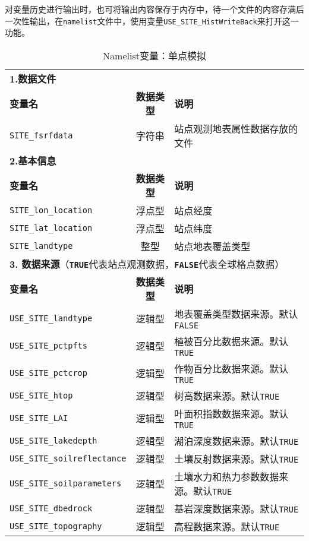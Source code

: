 对变量历史进行输出时，也可将输出内容保存于内存中，待一个文件的内容存满后一次性输出，在\texttt{namelist}文件中，使用变量\texttt{USE\_SITE\_HistWriteBack}来打开这一功能。

\begin{table}[!htbp] \small
\caption{Namelist变量：单点模拟}
\label{table_nl_singlepoint}
\centering \renewcommand{\arraystretch}{1.5}
\begin{tabular}{lcp{}}
\toprule
\textbf{1.数据文件} & & \\
\textbf{变量名} & \textbf{数据类型} & \textbf{说明} \\
\texttt{SITE\_fsrfdata} & 字符串 & 站点观测地表属性数据存放的文件 \\\midrule
\textbf{2.基本信息} & & \\
\textbf{变量名} & \textbf{数据类型} & \textbf{说明} \\
\texttt{SITE\_lon\_location} & 浮点型 & 站点经度 \\
\texttt{SITE\_lat\_location} & 浮点型 & 站点纬度 \\
\texttt{SITE\_landtype} & 整型 & 站点地表覆盖类型 \\
\midrule
\multicolumn{3}{l}{\textbf{3. 数据来源}（\textbf{\texttt{TRUE}}代表站点观测数据，\textbf{\texttt{FALSE}}代表全球格点数据）} \\
\textbf{变量名} & \textbf{数据类型} & \textbf{说明} \\
\texttt{USE\_SITE\_landtype} & 逻辑型 & 地表覆盖类型数据来源。默认\texttt{FALSE} \\
\texttt{USE\_SITE\_pctpfts} & 逻辑型 & 植被百分比数据来源。默认\texttt{TRUE} \\
\texttt{USE\_SITE\_pctcrop} & 逻辑型 & 作物百分比数据来源。默认\texttt{TRUE} \\
\texttt{USE\_SITE\_htop} & 逻辑型 & 树高数据来源。默认\texttt{TRUE} \\
\texttt{USE\_SITE\_LAI} & 逻辑型 & 叶面积指数数据来源。默认\texttt{TRUE} \\
\texttt{USE\_SITE\_lakedepth} & 逻辑型 & 湖泊深度数据来源。默认\texttt{TRUE} \\
\texttt{USE\_SITE\_soilreflectance} & 逻辑型 & 土壤反射数据来源。默认\texttt{TRUE} \\
\texttt{USE\_SITE\_soilparameters} & 逻辑型 & 土壤水力和热力参数数据来源。默认\texttt{TRUE} \\
\texttt{USE\_SITE\_dbedrock} & 逻辑型 & 基岩深度数据来源。默认\texttt{TRUE} \\
\texttt{USE\_SITE\_topography} & 逻辑型 & 高程数据来源。默认\texttt{TRUE} \\

\end{tabular}
\end{table}
